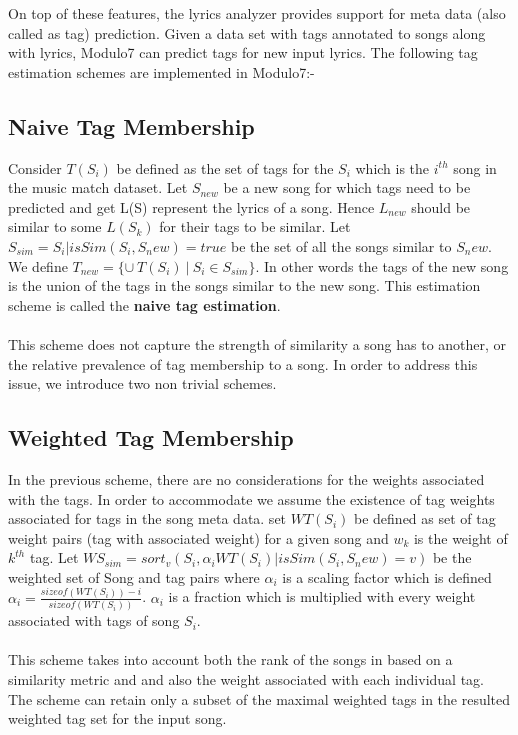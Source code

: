 \noindent On top of these features, the lyrics analyzer provides support for meta data (also called as tag) prediction. Given a data set with tags annotated to songs along with lyrics, Modulo7 can predict tags for new input lyrics. The following tag estimation schemes are implemented in Modulo7:-

\subsection{Naive Tag Membership}

\noindent Consider $T(S_i)$ be defined as the set of tags for the $S_i$ which is the $i^{th}$ song in the music match dataset. Let $S_{new}$ be a new song for which tags need to be predicted and get L(S) represent the lyrics of a song. Hence $L_{new}$ should be similar to some $L(S_k)$ for their tags to be similar. Let $S_{sim} = {S_i | isSim(S_i, S_new) = true} $ be the set of all the songs similar to $S_new$. We define $T_{new} = \{\cup \ T(S_i) \ | \ S_i \in S_{sim}\}$. In other words the tags of the new song is the union of the tags in the songs similar to the new song. This estimation scheme is called the \textbf{naive tag estimation}. \\\\
This scheme does not capture the strength of similarity a song has to another, or the relative prevalence of tag membership to a song. In order to address this issue, we introduce two non trivial schemes.

\subsection{Weighted Tag Membership}

\noindent In the previous scheme, there are no considerations for the weights associated with the tags. In order to accommodate we assume the existence of tag weights associated for tags in the song meta data. 
set $WT(S_i)$ be defined as set of tag weight pairs (tag with associated weight) for a given song and $w_k$ is the weight of $k^{th}$ tag. Let $WS_{sim} = sort_v({S_i, \alpha_i WT(S_i) | isSim(S_i, S_new) = v})$ be the weighted set of Song and tag pairs where $\alpha_i$ is a scaling factor which is defined $\alpha_i = \frac{sizeof(WT(S_i)) - i}{sizeof(WT(S_i))}$. $\alpha_i$ is a fraction which is multiplied with every weight associated with tags of song $S_i$. \\\\
This scheme takes into account both the rank of the songs in based on a similarity metric and and also the weight associated with each individual tag. The scheme can retain only a subset of the maximal weighted tags in the resulted weighted tag set for the input song.

